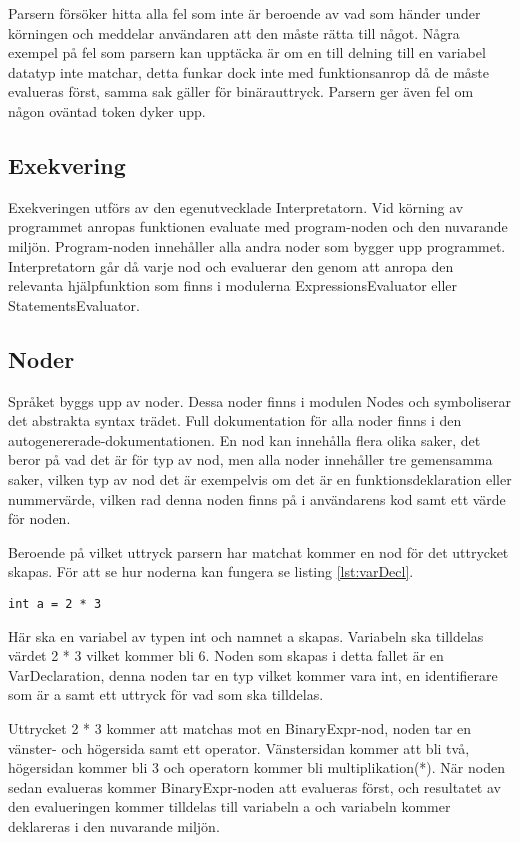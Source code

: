 \documentclass{TDP003mall}
\begin{document}
Parsern försöker hitta alla fel som inte är beroende av vad som händer under körningen och meddelar användaren att den måste rätta till något.
Några exempel på fel som parsern kan upptäcka är om en till delning till en variabel datatyp inte matchar, detta funkar dock inte med funktionsanrop då de måste evalueras först, samma sak gäller för binärauttryck.
Parsern ger även fel om någon oväntad token dyker upp.

\subsection{Exekvering}
Exekveringen utförs av den egenutvecklade Interpretatorn.
Vid körning av programmet anropas funktionen evaluate med program-noden och den nuvarande miljön.
Program-noden innehåller alla andra noder som bygger upp programmet.
Interpretatorn går då varje nod och evaluerar den genom att anropa den relevanta hjälpfunktion som finns i modulerna ExpressionsEvaluator eller StatementsEvaluator.

\subsection{Noder}
Språket byggs upp av noder. Dessa noder finns i modulen Nodes och symboliserar det abstrakta syntax trädet. 
Full dokumentation för alla noder finns i den autogenererade-dokumentationen.
En nod kan innehålla flera olika saker, det beror på vad det är för typ av nod, men alla noder innehåller tre gemensamma saker, 
vilken typ av nod det är exempelvis om det är en funktionsdeklaration eller nummervärde, vilken rad denna noden finns på i användarens kod samt ett värde för noden.

Beroende på vilket uttryck parsern har matchat kommer en nod för det uttrycket skapas.
För att se hur noderna kan fungera se listing \ref{lst:varDecl}.

\begin{lstlisting}[caption=Variabel deklaration, label=lst:varDecl]
int a = 2 * 3
\end{lstlisting}

Här ska en variabel av typen int och namnet a skapas. 
Variabeln ska tilldelas värdet 2 * 3 vilket kommer bli 6.
Noden som skapas i detta fallet är en VarDeclaration, denna noden tar en typ vilket kommer vara int, en identifierare som är a samt ett uttryck för vad som ska tilldelas.

Uttrycket 2 * 3 kommer att matchas mot en BinaryExpr-nod, noden tar en vänster- och högersida samt ett operator.
Vänstersidan kommer att bli två, högersidan kommer bli 3 och operatorn kommer bli multiplikation(*).
När noden sedan evalueras kommer BinaryExpr-noden att evalueras först, och resultatet av den evalueringen kommer tilldelas till variabeln a och variabeln kommer deklareras i den nuvarande miljön.
\end{document}
